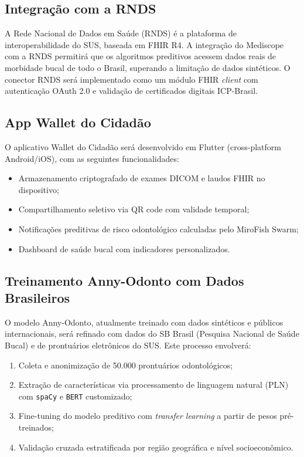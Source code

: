 \subsection{Integração com a RNDS}

A Rede Nacional de Dados em Saúde (RNDS) é a plataforma de interoperabilidade do SUS, baseada em FHIR R4. A integração do Mediscope com a RNDS permitirá que os algoritmos preditivos acessem dados reais de morbidade bucal de todo o Brasil, superando a limitação de dados sintéticos. O conector RNDS será implementado como um módulo FHIR \textit{client} com autenticação OAuth 2.0 e validação de certificados digitais ICP-Brasil.

\subsection{App Wallet do Cidadão}

O aplicativo Wallet do Cidadão será desenvolvido em Flutter (cross-platform Android/iOS), com as seguintes funcionalidades:
\begin{itemize}
    \item Armazenamento criptografado de exames DICOM e laudos FHIR no dispositivo;
    \item Compartilhamento seletivo via QR code com validade temporal;
    \item Notificações preditivas de risco odontológico calculadas pelo MiroFish Swarm;
    \item Dashboard de saúde bucal com indicadores personalizados.
\end{itemize}

\subsection{Treinamento Anny-Odonto com Dados Brasileiros}

O modelo Anny-Odonto, atualmente treinado com dados sintéticos e públicos internacionais, será refinado com dados do SB Brasil (Pesquisa Nacional de Saúde Bucal) e de prontuários eletrônicos do SUS. Este processo envolverá:

\begin{enumerate}
    \item Coleta e anonimização de 50.000 prontuários odontológicos;
    \item Extração de características via processamento de linguagem natural (PLN) com \texttt{spaCy} e \texttt{BERT} customizado;
    \item Fine-tuning do modelo preditivo com \textit{transfer learning} a partir de pesos pré-treinados;
    \item Validação cruzada estratificada por região geográfica e nível socioeconômico.
\end{enumerate}

